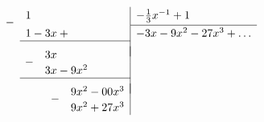 \documentclass{article}
\newcommand{\dropsign}[1]{\smash{\llap{\raisebox{-.5\normalbaselineskip}{$#1$\hspace{2\arraycolsep}}}}}%
\newcommand{\longdivline}{\cline{1-1} \\[\dimexpr-\normalbaselineskip+\jot]}
\begin{document}
\[
  \setlength\extrarowheight{2pt}
  \begin{array}{r|l}
    \dropsign{-} 1\hphantom{{}+{}0x{}+{}0x^2{}+{}00x^3}& -\frac{1}{3}x^{-1} + 1 \\[2pt] \cline{2-2}
    1 - 3x +\hphantom{{}0x^2{}+{}00x^3}& -3x - 9x^2 - 27x^3 + \dots \\ \longdivline
    \dropsign{-} 3x\hphantom{{}-{}0x^2{}+{}00x^3}&\\
                 3x - 9x^2\hphantom{{}+{}00x^3}&\\ \longdivline
    \dropsign{-} 9x^2 - 00x^3&\\
                 9x^2 + 27x^3&
  \end{array}
\]
\end{document}
